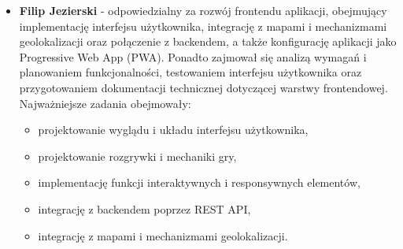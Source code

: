 \smallskip
\begin{itemize}
  \item \textbf{Filip Jezierski} - odpowiedzialny za rozwój frontendu aplikacji, obejmujący implementację interfejsu użytkownika, integrację z mapami i mechanizmami geolokalizacji oraz połączenie z backendem, a także konfigurację aplikacji jako Progressive Web App (PWA). Ponadto zajmował się analizą wymagań i planowaniem funkcjonalności, testowaniem interfejsu użytkownika oraz przygotowaniem dokumentacji technicznej dotyczącej warstwy frontendowej.
        Najważniejsze zadania obejmowały:
        \begin{itemize}
          \item projektowanie wyglądu i układu interfejsu użytkownika,
          \item projektowanie rozgrywki i mechaniki gry,
          \item implementację funkcji interaktywnych i responsywnych elementów,
          \item integrację z backendem poprzez REST API,
          \item integrację z mapami i mechanizmami geolokalizacji.
        \end{itemize}
        

\end{itemize}
